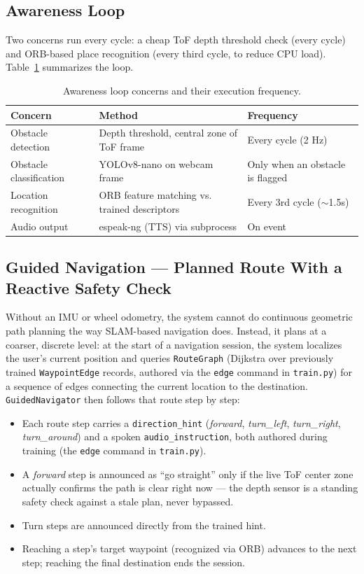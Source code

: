 \documentclass[12pt,a4paper]{article}
\begin{document}
\subsection{Awareness Loop}
Two concerns run every cycle: a cheap ToF depth threshold check (every cycle) and ORB-based place recognition (every third cycle, to reduce CPU load). Table~\ref{tab:loop} summarizes the loop.

\begin{table}[H]
\centering
\begin{tabularx}{\textwidth}{l X l}
\toprule
\textbf{Concern} & \textbf{Method} & \textbf{Frequency} \\
\midrule
Obstacle detection & Depth threshold, central zone of ToF frame & Every cycle (2 Hz) \\
Obstacle classification & YOLOv8-nano on webcam frame & Only when an obstacle is flagged \\
Location recognition & ORB feature matching vs. trained descriptors & Every 3rd cycle ($\sim$1.5s) \\
Audio output & espeak-ng (TTS) via subprocess & On event \\
\bottomrule
\end{tabularx}
\caption{Awareness loop concerns and their execution frequency.}
\label{tab:loop}
\end{table}

\subsection{Guided Navigation — Planned Route With a Reactive Safety Check}
\label{sec:guided-nav}
Without an IMU or wheel odometry, the system cannot do continuous geometric path planning the way SLAM-based navigation does. Instead, it plans at a coarser, discrete level: at the start of a navigation session, the system localizes the user's current position and queries \texttt{RouteGraph} (Dijkstra over previously trained \texttt{WaypointEdge} records, authored via the \texttt{edge} command in \texttt{train.py}) for a sequence of edges connecting the current location to the destination. \texttt{GuidedNavigator} then follows that route step by step:

\begin{itemize}[leftmargin=1.4cm]
  \item Each route step carries a \texttt{direction\_hint} (\textit{forward}, \textit{turn\_left}, \textit{turn\_right}, \textit{turn\_around}) and a spoken \texttt{audio\_instruction}, both authored during training (the \texttt{edge} command in \texttt{train.py}).
  \item A \textit{forward} step is announced as ``go straight'' only if the live ToF center zone actually confirms the path is clear right now — the depth sensor is a standing safety check against a stale plan, never bypassed.
  \item Turn steps are announced directly from the trained hint.
  \item Reaching a step's target waypoint (recognized via ORB) advances to the next step; reaching the final destination ends the session.
\end{itemize}
\end{document}
